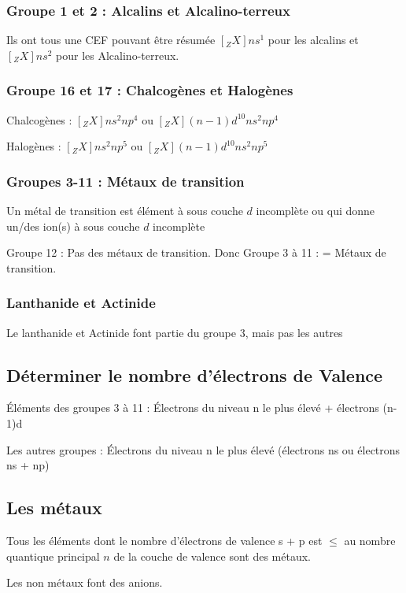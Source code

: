 \documentclass[french]{yLectureNote}
\begin{document}
\subsubsection{Groupe 1 et 2 : Alcalins et Alcalino-terreux}
Ils ont tous une CEF pouvant \^etre résumée $[_ZX]ns^1$ pour les alcalins et $[_ZX]ns^2$ pour les Alcalino-terreux.

\subsubsection{Groupe 16 et 17 : Chalcogènes et Halogènes}
Chalcogènes : $[_ZX]ns^2 np^4$ ou $[_ZX](n-1)d^{10} ns^2 np^4$

Halogènes : $[_ZX]ns^2 np^5$ ou $[_ZX](n-1)d^{10} ns^2 np^5$
\subsubsection{Groupes 3-11 : Métaux de transition}
\begin{theorem}
Un métal de transition est élément à sous couche $d$ incomplète ou qui donne un/des ion(s) à sous couche $d$ incomplète
\end{theorem}

Groupe 12 : Pas des métaux de transition. Donc Groupe 3 à 11 : = Métaux de transition.
\subsubsection{Lanthanide et Actinide}
Le lanthanide et Actinide font partie du groupe 3, mais pas les autres
\subsection{Déterminer le nombre d'électrons de Valence}
Éléments des groupes 3 à 11 : Électrons du niveau n le plus élevé + électrons (n-1)d

Les autres groupes : Électrons du niveau n le plus élevé (électrons ns ou électrons ns + np)

\subsection{Les métaux}
\begin{theorem}[]
Tous
les éléments dont le nombre
d’électrons de valence s + p
est $\leq$ au nombre quantique
principal $n$ de la couche de
valence sont des métaux.
\end{theorem}
Les non métaux font des anions.
\end{document}

